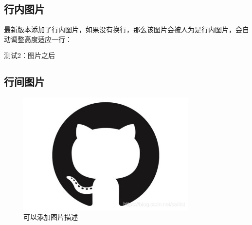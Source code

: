 \documentclass{article}%
\begin{document}
%
\subsection{行内图片}%

%

%
最新版本添加了行内图片，如果没有换行，那么该图片会被人为是行内图片，会自动调整高度适应一行：%

%
测试2：图片之后%

%
\subsection{行间图片}%

%

%
\begin{center}%


\begin{figure}[H]%
%
\includegraphics[width=0.8\textwidth]{imgs/1c59f8ef2aa3c5e527a22b7c258489d6.png}%
\caption{可以添加图片描述}%
\end{figure}

%
\end{center}%
\end{document}

